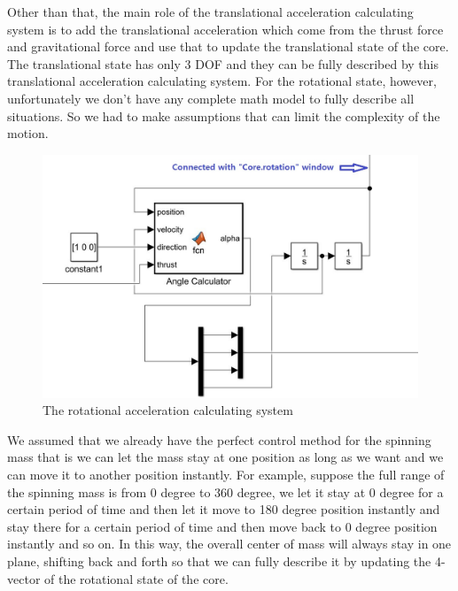 Other than that, the main role of the translational acceleration calculating system is to add the translational acceleration which come from the thrust force and gravitational force and use that to update the translational state of the core. The translational state has only 3 DOF and they can be fully described by this translational acceleration  calculating system.
\newline
\newline
For the rotational state, however, unfortunately we don’t have any complete math model to fully describe all situations. So we had to make assumptions that can limit the complexity of the motion. 
\begin{figure}[h]
\centering
\includegraphics[width=1.0\textwidth]{./Lin_img/6.JPG}
\caption{The rotational acceleration calculating system}
\end{figure}
\newline
We assumed that we already have the perfect control method for the spinning mass that is we can let the mass stay at one position as long as we want and we can move it to another position instantly.
\newline
\newline
For example, suppose the full range of the spinning mass is from 0 degree to 360 degree, we let it stay at 0 degree for a certain period of time and then let it move to 180 degree position instantly and stay there for a certain period of time and then move back to 0 degree position instantly and so on. 
\newline
\newline
In this way, the overall center of mass will always stay in one plane, shifting back and forth so that we can fully describe it by updating the 4-vector of the rotational state of the core.
